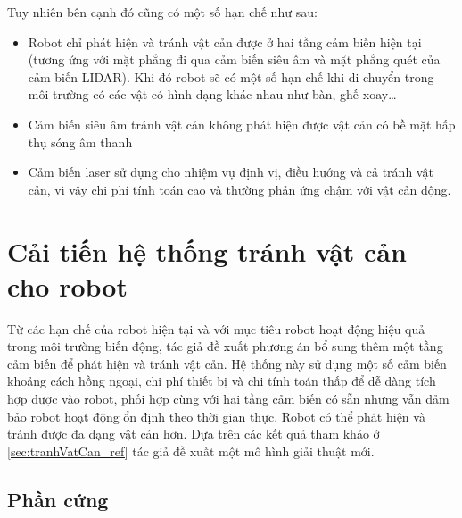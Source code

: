 Tuy nhiên bên cạnh đó cũng có một số hạn chế như sau:

\begin{itemize}
    \item Robot chỉ phát hiện và tránh vật cản được ở hai tầng cảm biến hiện tại (tương ứng với mặt phẳng đi qua cảm biến siêu âm và mặt phẳng quét của cảm biến LIDAR). Khi đó robot sẽ có một số hạn chế khi di chuyển trong môi trường có các vật có hình dạng khác nhau như bàn, ghế xoay\dots
    \item Cảm biến siêu âm tránh vật cản không phát hiện được vật cản có bề mặt hấp thụ sóng âm thanh
    \item Cảm biến laser sử dụng cho nhiệm vụ định vị, điều hướng và cả tránh vật cản, vì vậy chi phí tính toán cao và thường phản ứng chậm với vật cản động.
\end{itemize}


\section{Cải tiến hệ thống tránh vật cản cho robot}
\label{sec:caitienhethongtranhvatcan}


Từ các hạn chế của robot hiện tại và với mục tiêu robot hoạt động hiệu quả trong môi trường biến động, tác giả đề xuất phương án bổ sung thêm một tầng cảm biến để phát hiện và tránh vật cản. Hệ thống này sử dụng một số cảm biến khoảng cách hồng ngoại, chi phí thiết bị và chi tính toán thấp để dễ dàng tích hợp được vào robot, phối hợp cùng với hai tầng cảm biến có sẵn nhưng vẫn đảm bảo robot hoạt động ổn định theo thời gian thực. Robot có thể phát hiện và tránh được đa dạng vật cản hơn. Dựa trên các kết quả tham khảo ở \ref{sec:tranhVatCan_ref} tác giả đề xuất một mô hình giải thuật mới.

\subsection{Phần cứng}



